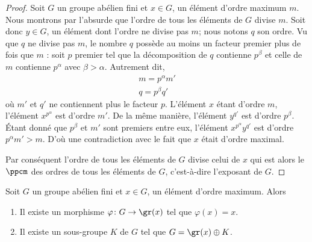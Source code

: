 \begin{proof}
	Soit \( G\) un groupe abélien fini et \( x\in G\), un élément d'ordre maximum \( m\). Nous montrons par l'absurde que l'ordre de tous les éléments de \( G\) divise \( m\). Soit donc \( y\in G\), un élément dont l'ordre ne divise pas \( m\); nous notons $q$ son ordre. Vu que \( q\) ne divise pas \( m\), le nombre \( q\) possède au moins un facteur premier plus de fois que \( m\) : soit \( p\) premier tel que la décomposition de \( q\) contienne \( p^{\beta}\) et celle de \( m\) contienne \( p^{\alpha}\) avec \( \beta>\alpha\). Autrement dit,
	\begin{subequations}
		\begin{align}
			m=p^{\alpha}m' \\
			q=p^{\beta}q'
		\end{align}
	\end{subequations}
	où \( m'\) et \( q'\) ne contiennent plus le facteur \( p\). L'élément \( x\) étant d'ordre \( m\), l'élément \( x^{p^{\alpha}}\) est d'ordre \( m'\). De la même manière, l'élément \( y^{q'}\) est d'ordre \( p^{\beta}\). Étant donné que \( p^{\beta}\) et \( m'\) sont premiers entre eux, l'élément  \( x^{p^{\alpha}}y^{q'}\) est d'ordre \( p^{\alpha}m'>m\). D'où une contradiction avec le fait que \( x\) était d'ordre maximal.

	Par conséquent l'ordre de tous les éléments de $G$ divise celui de \( x\) qui est alors le \( \ppcm\) des ordres de tous les éléments de \( G\), c'est-à-dire l'exposant de \( G\).
\end{proof}

\begin{proposition} \label{PropfPRVxi}
	Soit \( G\) un groupe abélien fini et \( x\in G\), un élément d'ordre maximum. Alors
	\begin{enumerate}
		\item
		      Il existe un morphisme \( \varphi\colon G\to \gr(x)\) tel que \( \varphi(x)=x\).
		\item   \label{ItemKRYwjU}
		      Il existe un sous-groupe \( K\) de \( G\) tel que \( G=\gr(x)\oplus K\).
	\end{enumerate}
\end{proposition}


